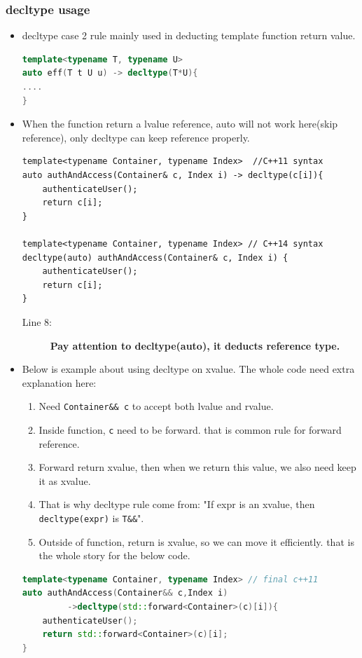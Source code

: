 \documentclass[a4paper,11pt,twoside]{book}
\begin{document}
\subsubsection{decltype usage}
\begin{itemize}
	\item decltype case 2 rule mainly used in deducting template function return value.
\begin{lstlisting}[frame=single, language=c++, mathescape=true]
template<typename T, typename U>
auto eff(T t U u) -> decltype(T*U){
....
}
\end{lstlisting}

	\item When the function return a lvalue reference, auto will not work here(skip reference), only decltype can keep reference properly.
\begin{lstlisting}
template<typename Container, typename Index>  //C++11 syntax
auto authAndAccess(Container& c, Index i) -> decltype(c[i]){
	authenticateUser();
	return c[i];
}

template<typename Container, typename Index> // C++14 syntax
decltype(auto) authAndAccess(Container& c, Index i) { 
	authenticateUser();                               
	return c[i];
}
\end{lstlisting}
\begin{description}
	\item[Line 8:] \textbf{Pay attention to decltype(auto), it deducts reference type.}
\end{description}
	
	\item Below is example about using decltype on xvalue. The whole code need extra explanation here:
	\begin{enumerate}
		\item Need \texttt{Container\&\& c} to accept both lvalue and rvalue.
		\item Inside function, \texttt{c} need to be forward. that is common rule for forward reference.
		\item Forward return xvalue, then when we return this value, we also need keep it as xvalue.
		\item That is why decltype rule come from: "If expr is an xvalue, then \texttt{decltype(expr)} is \texttt{T\&\&}".
		\item Outside of function, return is xvalue, so we can move it efficiently. that is the whole story for the below code. 
	\end{enumerate}
\begin{lstlisting}[frame=single, language=c++, mathescape=true]
template<typename Container, typename Index> // final c++11
auto authAndAccess(Container&& c,Index i)
         ->decltype(std::forward<Container>(c)[i]){
	authenticateUser();
	return std::forward<Container>(c)[i];
}


\end{lstlisting}
\end{itemize}
\end{document}
